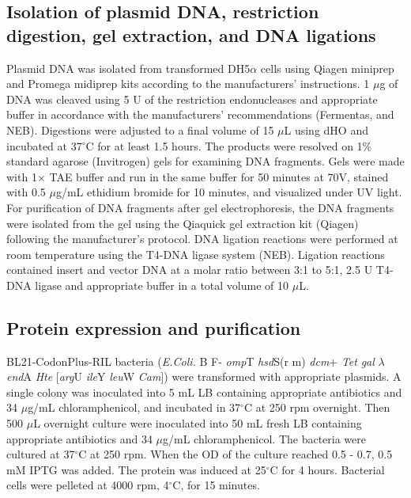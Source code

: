 \subsection{Isolation of plasmid DNA, restriction digestion, gel extraction, and DNA ligations}

Plasmid DNA was isolated from transformed DH5$\alpha$ cells using Qiagen miniprep and Promega midiprep kits according to the manufacturers' instructions. 1 $\mu$g of DNA was cleaved using 5 U of the restriction endonucleases and appropriate buffer in accordance with the manufacturers' recommendations (Fermentas, and NEB). Digestions were adjusted to a final volume of 15 $\mu$L using dHO and incubated at 37$^\circ$C for at least 1.5 hours. The products were resolved on 1\% standard agarose (Invitrogen) gels for examining DNA fragments. Gels were made with 1$\times$ TAE buffer and run in the same buffer for 50 minutes at 70V, stained with 0.5 $\mu$g/mL ethidium bromide for 10 minutes, and visualized under UV light. For purification of DNA fragments after gel electrophoresis, the DNA fragments were isolated from the gel using the Qiaquick gel extraction kit (Qiagen) following the manufacturer's protocol. DNA ligation reactions were performed at room temperature using the T4-DNA ligase system (NEB). Ligation reactions contained insert and vector DNA at a molar ratio between 3:1 to 5:1, 2.5 U T4-DNA ligase and appropriate buffer in a total volume of 10 $\mu$L.

\subsection{Protein expression and purification}

BL21-CodonPlus-RIL bacteria (\textit{E.Coli.} B F- \textit{omp}T \textit{hsd}S(r m) \textit{dcm}+ \textit{Tet} \textit{gal} $\lambda$ \textit{end}A \textit{Hte} [\textit{arg}U \textit{ile}Y \textit{leu}W \textit{Cam}]) were transformed with appropriate plasmids. A single colony was inoculated into 5 mL LB containing appropriate antibiotics and 34 $\mu$g/mL chloramphenicol, and incubated in 37$^\circ$C at 250 rpm overnight. Then 500 $\mu$L overnight culture were inoculated into 50 mL fresh LB containing appropriate antibiotics and 34 $\mu$g/mL chloramphenicol. The bacteria were cultured at 37$^\circ$C at 250 rpm. When the OD of the culture reached 0.5 - 0.7, 0.5 mM IPTG was added. The protein was induced at 25$^\circ$C for 4 hours. Bacterial cells were pelleted at 4000 rpm, 4$^\circ$C, for 15 minutes.

